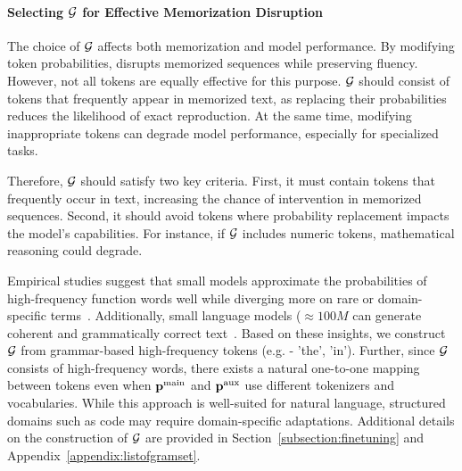 
\paragraph{Selecting \(\mathcal{G}\) for Effective Memorization Disruption}  
The choice of \(\mathcal{G}\) affects both memorization and model performance. By modifying token probabilities, \sys disrupts memorized sequences while preserving fluency. However, not all tokens are equally effective for this purpose. \(\mathcal{G}\) should consist of tokens that frequently appear in memorized text, as replacing their probabilities reduces the likelihood of exact reproduction. At the same time, modifying inappropriate tokens can degrade model performance, especially for specialized tasks.

Therefore, \(\mathcal{G}\) should satisfy two key criteria. First, it must contain tokens that frequently occur in text, increasing the chance of intervention in memorized sequences. Second, it should avoid tokens where probability replacement impacts the model's capabilities. For instance, if \(\mathcal{G}\) includes numeric tokens, mathematical reasoning could degrade.

Empirical studies suggest that small models approximate the probabilities of high-frequency function words well while diverging more on rare or domain-specific terms~\citep{pinto2024fair}. Additionally, small language models (\(\approx 100M\) can generate coherent and grammatically correct text~\citep{Eldan2023}. Based on these insights, we construct \(\mathcal{G}\) from grammar-based high-frequency tokens (e.g. - 'the', 'in'). Further, since \(\mathcal{G}\) consists of high-frequency words, there exists a natural one-to-one mapping between tokens even when \(\mathbf{p}^{\text{main}}\) and \(\mathbf{p}^{\text{aux}}\) use different tokenizers and vocabularies. While this approach is well-suited for natural language, structured domains such as code may require domain-specific adaptations. Additional details on the construction of \(\mathcal{G}\) are provided in Section~\ref{subsection:finetuning} and Appendix~\ref{appendix:listofgramset}.


